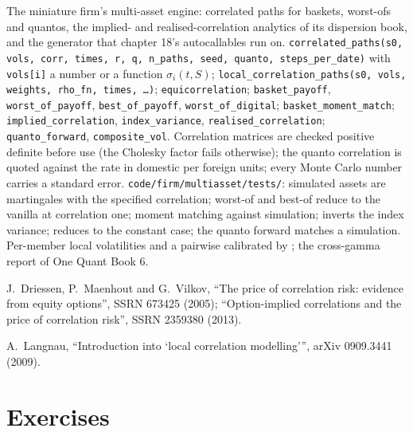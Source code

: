 \begin{build}
 The miniature firm's multi-asset engine: correlated paths for baskets, worst-ofs and quantos, the implied-
and realised-correlation analytics of its dispersion book, and the generator that chapter 18's autocallables run on.
 \texttt{correlated\_paths(s0, vols, corr, times, r, q, n\_paths, seed, quanto, steps\_per\_date)} with
\texttt{vols[i]} a number or a function $\sigma_i(t,S)$; \texttt{local\_correlation\_paths(s0, vols, weights, rho\_fn, times,
\ldots)}; \texttt{equicorrelation}; \texttt{basket\_payoff}, \texttt{worst\_of\_payoff}, \texttt{best\_of\_payoff},
\texttt{worst\_of\_digital}; \texttt{basket\_moment\_match}; \texttt{implied\_correlation}, \texttt{index\_variance},
\texttt{realised\_correlation}; \texttt{quanto\_forward}, \texttt{composite\_vol}.
 Correlation matrices are checked positive definite before use (the Cholesky factor fails otherwise); the quanto
correlation is quoted against the rate in domestic per foreign units; every Monte Carlo number carries a standard error.
 \texttt{code/firm/multiasset/tests/}: simulated assets are martingales with the specified correlation;
worst-of and best-of reduce to the vanilla at correlation one; moment matching against simulation;  inverts
the index variance;  reduces to the constant case; the quanto forward matches a simulation.
 Per-member local volatilities and a pairwise  calibrated by ; the
cross-gamma report of One Quant Book 6.
\end{build}

\begin{omsources}
\item J.~Driessen, P.~Maenhout and G.~Vilkov, ``The price of correlation risk: evidence from equity options'', SSRN 673425
(2005); ``Option-implied correlations and the price of correlation risk'', SSRN 2359380 (2013).
\item A.~Langnau, ``Introduction into `local correlation modelling''', arXiv 0909.3441 (2009).
\end{omsources}

\section{Exercises}

